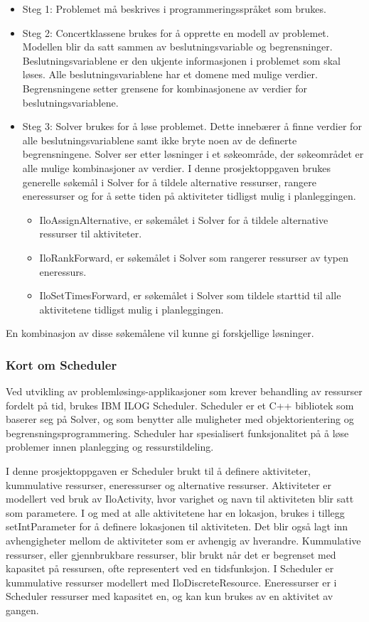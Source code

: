 \begin{itemize}
\item Steg 1:
Problemet må beskrives i programmeringsspråket som brukes.
\item Steg 2:
Concertklassene brukes for å opprette en modell av problemet. Modellen blir da satt sammen av beslutningsvariable og begrensninger. Beslutningsvariablene er den ukjente informasjonen i problemet som skal løses. Alle beslutningsvariablene har et domene med mulige verdier. Begrensningene setter grensene for kombinasjonene av verdier for beslutningsvariablene.
\item Steg 3:
Solver brukes for å løse problemet. Dette innebærer å finne verdier for alle beslutningsvariablene samt ikke bryte noen av de definerte begrensningene. Solver ser etter løsninger i et søkeområde, der søkeområdet er alle mulige kombinasjoner av verdier. I denne prosjektoppgaven brukes generelle søkemål i Solver for å tildele alternative ressurser, rangere eneressurser og for å sette tiden på aktiviteter tidligst mulig i planleggingen.
\begin{itemize}
\item IloAssignAlternative, er søkemålet i Solver for å tildele alternative ressurser til aktiviteter.
\item IloRankForward, er søkemålet i Solver som rangerer ressurser av typen eneressurs.
\item IloSetTimesForward, er søkemålet i Solver som tildele starttid til alle aktivitetene tidligst mulig i planleggingen.
\end{itemize}
\end{itemize}
En kombinasjon av disse søkemålene vil kunne gi forskjellige løsninger.
\cite{cpsolverilog}

\subsubsection{Kort om Scheduler}
Ved utvikling av problemløsings-applikasjoner som krever behandling av ressurser fordelt på tid, brukes IBM ILOG Scheduler. Scheduler er et C++ bibliotek som baserer seg på Solver, og som benytter alle muligheter med objektorientering og begrensningsprogrammering. Scheduler har spesialisert funksjonalitet på å løse problemer innen planlegging og ressurstildeling.

I denne prosjektoppgaven er Scheduler brukt til å definere aktiviteter, kummulative ressurser, eneressurser og alternative ressurser. Aktiviteter er modellert ved bruk av IloActivity, hvor varighet og navn til aktiviteten blir satt som parametere. I og med at alle aktivitetene har en lokasjon, brukes i tillegg setIntParameter for å definere lokasjonen til aktiviteten. Det blir også lagt inn avhengigheter mellom de aktiviteter som er avhengig av hverandre. Kummulative ressurser, eller gjennbrukbare ressurser, blir brukt når det er begrenset med kapasitet på ressursen, ofte representert ved en tidsfunksjon. I Scheduler er kummulative ressurser modellert med IloDiscreteResource. Eneressurser er i Scheduler ressurser med kapasitet en, og kan kun brukes av en aktivitet av gangen.
\cite{cpschedulerilog}